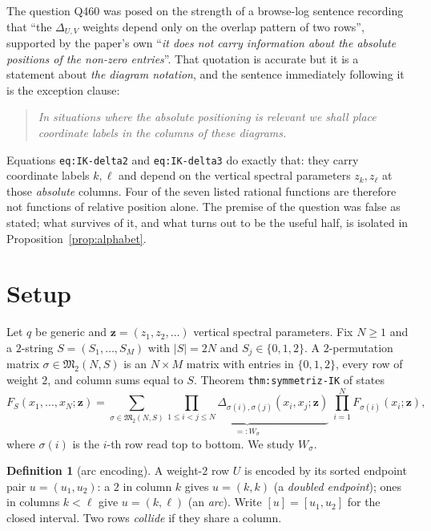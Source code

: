 \documentclass[11pt]{article}
\theoremstyle{plain}
\theoremstyle{definition}
\newtheorem{defn}[thm]{Definition}
\newcommand{\MM}{\mathfrak{M}}
\newcommand{\Dl}{\Delta}
\newcommand{\bz}{\bm{z}}
\begin{document}
The question Q460 was posed on the strength of a browse-log sentence recording
that ``the $\Dl_{U,V}$ weights depend only on the overlap pattern of two
rows'', supported by the paper's own
``\emph{it does not carry information about the absolute positions of the
non-zero entries}''. That quotation is accurate but it is a statement about
\emph{the diagram notation}, and the sentence immediately following it is the
exception clause:

\begin{quote}\itshape
In situations where the absolute positioning is relevant we shall place
coordinate labels in the columns of these diagrams.
\end{quote}

Equations \texttt{eq:IK-delta2} and \texttt{eq:IK-delta3} do exactly that: they
carry coordinate labels $k,\ell$ and depend on the vertical spectral parameters
$z_k,z_\ell$ at those \emph{absolute} columns. Four of the seven listed
rational functions are therefore not functions of relative position alone. The
premise of the question was false as stated; what survives of it, and what turns
out to be the useful half, is isolated in Proposition~\ref{prop:alphabet}.

\section{Setup}

Let $q$ be generic and $\bz=(z_1,z_2,\dots)$ vertical spectral parameters. Fix
$N\ge1$ and a $2$-string $S=(S_1,\dots,S_M)$ with $|S|=2N$ and $S_j\in\{0,1,2\}$.
A $2$-permutation matrix $\sigma\in\MM_2(N,S)$ is an $N\times M$ matrix with
entries in $\{0,1,2\}$, every row of weight $2$, and column sums equal to $S$.
Theorem \texttt{thm:symmetriz-IK} of \cite{GGW} states
\begin{equation}\label{eq:sym}
F_S(x_1,\dots,x_N;\bz)=\sum_{\sigma\in\MM_2(N,S)}
\underbrace{\prod_{1\le i<j\le N}\Dl_{\sigma(i),\sigma(j)}(x_i,x_j;\bz)}_{=:W_\sigma}
\;\prod_{i=1}^{N}F_{\sigma(i)}(x_i;\bz),
\end{equation}
where $\sigma(i)$ is the $i$-th row read top to bottom. We study $W_\sigma$.

\begin{defn}[arc encoding]
A weight-$2$ row $U$ is encoded by its sorted endpoint pair $u=(u_1,u_2)$:
a $2$ in column $k$ gives $u=(k,k)$ (a \emph{doubled endpoint}); ones in
columns $k<\ell$ give $u=(k,\ell)$ (an \emph{arc}). Write $[u]=[u_1,u_2]$ for the
closed interval. Two rows \emph{collide} if they share a column.
\end{defn}
\end{document}
